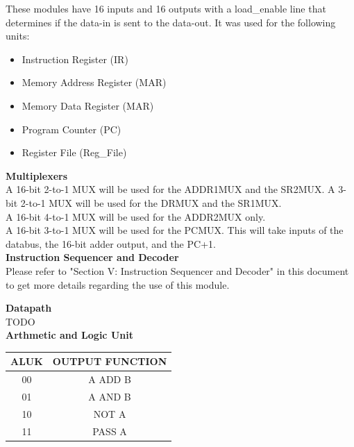 \documentclass[journal, twocolumn, final,11pt,letterpaper]{IEEEtran}
\begin{document}
These modules have 16 inputs and 16 outputs with a load\_enable line that determines if the data-in is sent to the data-out. It was used for the following units: 
\begin{itemize}
	\item Instruction Register (IR)
	\item Memory Address Register (MAR)
	\item Memory Data Register (MAR)
	\item Program Counter (PC)
	\item Register File (Reg\_File)
\end{itemize} 

\normalsize\textbf{Multiplexers} \\

A 16-bit 2-to-1 MUX will be used for the ADDR1MUX and the SR2MUX. A 3-bit 2-to-1 MUX will be used for the DRMUX and the SR1MUX. \\

A 16-bit 4-to-1 MUX will be used for the ADDR2MUX only. \\

A 16-bit 3-to-1 MUX will be used for the PCMUX. This will take inputs of the databus, the 16-bit adder output, and the PC+1. \\

\normalsize\textbf{Instruction Sequencer and Decoder } \\

Please refer to "Section V: Instruction Sequencer and Decoder" in this document to get more details regarding the use of this module.

\normalsize\textbf{Datapath} \\
TODO \\

\normalsize\textbf{Arthmetic and Logic Unit} \\
\begin{table}[htbp]
	\centering
	\begin{tabular}{cc}	%
		\toprule	%
		ALUK & OUTPUT FUNCTION \\
		\midrule
		00 & A ADD B \\
		01 & A AND B \\
		10 & NOT A \\
		11 & PASS A \\
		\bottomrule	%
	\end{tabular}%
	\label{tab:ALU-table}
\end{table}
\end{document}

